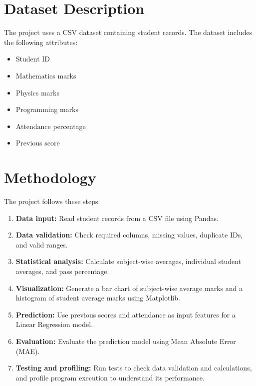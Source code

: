 \documentclass[12pt,a4paper]{article}
\begin{document}
\section{Dataset Description}

The project uses a CSV dataset containing student records.
The dataset includes the following attributes:

\begin{itemize}
    \item Student ID
    \item Mathematics marks
    \item Physics marks
    \item Programming marks
    \item Attendance percentage
    \item Previous score
\end{itemize}

\section{Methodology}

The project follows these steps:

\begin{enumerate}
    \item \textbf{Data input:} Read student records from a CSV file
    using Pandas.
    
    \item \textbf{Data validation:} Check required columns,
    missing values, duplicate IDs, and valid ranges.
    
    \item \textbf{Statistical analysis:} Calculate subject-wise
    averages, individual student averages, and pass percentage.
    
    \item \textbf{Visualization:} Generate a bar chart of
    subject-wise average marks and a histogram of student
    average marks using Matplotlib.
    
    \item \textbf{Prediction:} Use previous scores and attendance
    as input features for a Linear Regression model.
    
    \item \textbf{Evaluation:} Evaluate the prediction model
    using Mean Absolute Error (MAE).
    
    \item \textbf{Testing and profiling:} Run tests to check
    data validation and calculations, and profile program
    execution to understand its performance.
\end{enumerate}
\end{document}

